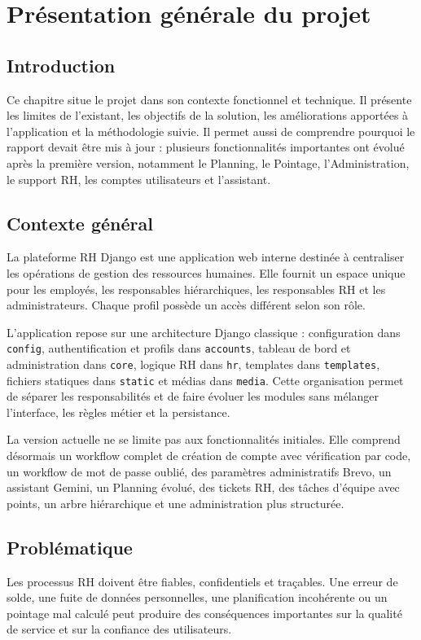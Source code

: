 \documentclass[12pt,a4paper]{report}
\begin{document}
\chapter{Présentation générale du projet}
\section{Introduction}
Ce chapitre situe le projet dans son contexte fonctionnel et technique. Il présente les limites de l'existant, les objectifs de la solution, les améliorations apportées à l'application et la méthodologie suivie. Il permet aussi de comprendre pourquoi le rapport devait être mis à jour : plusieurs fonctionnalités importantes ont évolué après la première version, notamment le Planning, le Pointage, l'Administration, le support RH, les comptes utilisateurs et l'assistant.

\section{Contexte général}
La plateforme RH Django est une application web interne destinée à centraliser les opérations de gestion des ressources humaines. Elle fournit un espace unique pour les employés, les responsables hiérarchiques, les responsables RH et les administrateurs. Chaque profil possède un accès différent selon son rôle.

L'application repose sur une architecture Django classique : configuration dans \texttt{config}, authentification et profils dans \texttt{accounts}, tableau de bord et administration dans \texttt{core}, logique RH dans \texttt{hr}, templates dans \texttt{templates}, fichiers statiques dans \texttt{static} et médias dans \texttt{media}. Cette organisation permet de séparer les responsabilités et de faire évoluer les modules sans mélanger l'interface, les règles métier et la persistance.

La version actuelle ne se limite pas aux fonctionnalités initiales. Elle comprend désormais un workflow complet de création de compte avec vérification par code, un workflow de mot de passe oublié, des paramètres administratifs Brevo, un assistant Gemini, un Planning évolué, des tickets RH, des tâches d'équipe avec points, un arbre hiérarchique et une administration plus structurée.

\section{Problématique}
Les processus RH doivent être fiables, confidentiels et traçables. Une erreur de solde, une fuite de données personnelles, une planification incohérente ou un pointage mal calculé peut produire des conséquences importantes sur la qualité de service et sur la confiance des utilisateurs.
\end{document}
